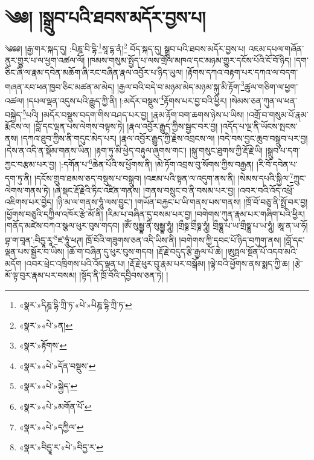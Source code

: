 \chapter{༄༅། །སྒྲུབ་པའི་ཐབས་མདོར་བྱས་པ།}༄༅༅། །རྒྱ་གར་སྐད་དུ། :པིཎྜ་བི་དྷི་\footnote{«སྣར་»དིཎྜ་དྷི་ཀྲི་ཏ་«པེ་»པིཎྜ་དྷི་ཀྲི་ཏ་}སཱ་དྷ་ནཾ།\footnote{«སྣར་»«པེ་»ན།} བོད་སྐད་དུ། སྒྲུབ་པའི་ཐབས་མདོར་བྱས་པ། འཇམ་དཔལ་གཞོན་ནུར་གྱུར་པ་ལ་ཕྱག་འཚལ་ལོ། །ཁམས་གསུམ་སྤྱོད་པ་ལས་གྲོལ་མཁའ་དང་མཉམ་གྱུར་དངོས་པོའི་ངོ་བོ་ཉིད། །དག་ཅིང་ཞི་ལ་རྣམ་དབེན་མཆོག་ཞི་རང་བཞིན་རྣལ་འབྱོར་པ་ཉིད་ཡུལ། །རྟོགས་དཀའ་བརྟག་པར་དཀའ་ལ་བདག་གཞན་རབ་ཕན་ཁྱབ་ཅིང་མཚན་མ་མེད། །རྒྱལ་བའི་བདེ་བ་མཉམ་མེད་མཉམ་སྐུ་མི་རྟོག་\footnote{«སྣར་»རྟོགས་}ཚུལ་གཅིག་ལ་ཕྱག་འཚལ། །དཔལ་ལྡན་འདུས་པའི་རྒྱུད་ཀྱི་ནི། །:མདོར་བསྡུས་\footnote{«སྣར་»«པེ་»དོན་བསྡུས་}རྟོགས་པར་བྱ་བའི་ཕྱིར། །སེམས་ཅན་ཀུན་ལ་ཕན་བསྐྱེད་\footnote{«སྣར་»«པེ་»སྐྱེད་}པའི། །མདོར་བསྡུས་བདག་གིས་བཤད་པར་བྱ། །རྣམ་རྟོག་བག་ཆགས་ཉེས་པ་ཡིས། །འགྲོ་བ་གསུམ་པོ་རྣམ་རྨོངས་ལ། །བློ་དང་ལྡན་པས་ལེགས་བལྟས་ཏེ། །རྣལ་འབྱོར་རྒྱུད་ཀྱིས་སྦྱང་བར་བྱ། །འདོད་པ་ལྔ་ནི་ཡོངས་སྤངས་ནས། །དཀའ་ཐུབ་ཀྱིས་ནི་གདུང་མེད་པར། །རྣལ་འབྱོར་རྒྱུད་ཀྱི་རྗེས་འབྲངས་ལ། །བདེ་བས་བྱང་ཆུབ་བསྒྲུབ་པར་བྱ། །དེས་ན་འདི་ན་སྡོམ་གནས་ཡིན། །རྟག་ཏུ་མི་ཕྱེད་བརྟུལ་ཞུགས་གང་། །སྐུ་གསུང་ཐུགས་ཀྱི་རྡོ་རྗེ་ཡི། །སྒྲུབ་པ་དག་ཀྱང་བརྩམ་པར་བྱ། །:དགོན་པ་\footnote{«སྣར་»«པེ་»མགོན་པོ་}ཆེན་པོའི་ས་ཕྱོགས་ནི། །མེ་ཏོག་འབྲས་བུ་སོགས་ཀྱིས་བརྒྱན། །རི་བོ་དབེན་པ་དག་ཏུ་ནི། །དངོས་གྲུབ་ཐམས་ཅད་བསྡུས་པ་བསྒྲུབ། །འཇམ་པའི་སྟན་ལ་འདུག་ནས་ནི། །སེམས་དཔའི་སྐྱིལ་\footnote{«སྣར་»«པེ་»དཀྱིལ་}ཀྲུང་ལེགས་གནས་ཏེ། །ཞེ་སྡང་རྡོ་རྗེའི་ཏིང་འཛིན་གནས། །གནས་བསྲུང་བ་ནི་བསམ་པར་བྱ། །འབར་བའི་འོད་འཕྲོ་འཇིགས་པར་བྱེད། །ཉི་མ་ལ་གནས་ཧཱུཾ་ལས་བྱུང་། །གཡོན་བརྐྱང་པ་ཡི་གནས་པས་གནས། །ཁྲོ་བོ་བཅུ་ནི་སྤྲོ་བར་བྱ། །ཕྱོགས་བཅུའི་དཀྱིལ་འཁོར་རྩེ་མོ་ནི། །རིམ་པ་བཞིན་དུ་བསམ་པར་བྱ། །བགེགས་ཀུན་རྣམ་པར་གཞིག་པའི་ཕྱིར། །གནོད་མཛེས་བཀའ་སྩལ་ཕུར་བུས་གདབ། །ཨོཾ་སུམྦྷ་ནི་སུམྦྷ་ཧཱུཾ། །གྲྀཧྞ་གྲྀཧྞ་ཧཱུཾ། གྲྀཧྞཱ་པ་ཡ་གྲྀཧྞཱ་པ་ཡ་ཧཱུཾ། ཨཱ་ན་ཡ་ཧོ། བྷ་ག་བཱན་:བིདྱཱ་རཱ་\footnote{«སྣར་»བིདྱཱ་ར་«པེ་»བིདྱ་ར་}ཛ་ཧཱུཾ་ཕཊ། ཁྲོ་བོའི་གཟུགས་ཅན་འདི་ཡིས་ནི། །བགེགས་ཀྱི་དབང་པོ་ཉིད་བཀུག་ནས། །བློ་དང་ལྡན་པས་སྦྱོར་བ་ཡིས། །ཆོ་ག་བཞིན་དུ་ཕུར་བུས་གདབ། །རྡོ་རྗེ་བདུད་རྩི་རྒྱལ་པོ་ཆེ། །ཨུཏྤལ་སྔོན་པོ་འདབ་མའི་མདོག །འབར་ཕྲེང་འཁྲིགས་པའི་འོད་ལྡན་པ། །རྡོ་རྗེ་ཕུར་བུ་རྣམ་པར་བསྒོམ། །ལྟེ་བའི་ཕྱོགས་ནས་སྨད་ཀྱི་ཆ། །རྩེ་མོ་ལྟ་བུར་རྣམ་པར་བསམ། །སྟོད་ནི་ཁྲོ་བོའི་དབྱིབས་ཅན་ཏེ། །
